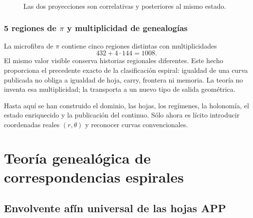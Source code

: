 \begin{figure}[htbp]
\centering
{}
\caption{Las dos proyecciones son correlativas y posteriores al mismo estado.}
\label{espiral:fig:doble-proyeccion-espiral}
\end{figure}

\section{5 regiones de \texorpdfstring{\(\pi\)}{pi} y multiplicidad de genealogías}

La microfibra de \(\pi\) contiene cinco regiones distintas con
multiplicidades
\[
 432+4\cdot144=1008.
\]
El mismo valor visible conserva historias regionales diferentes. Este hecho
proporciona el precedente exacto de la clasificación espiral: igualdad de
una curva publicada no obliga a igualdad de hoja, carry, frontera ni
memoria. La teoría no inventa esa multiplicidad; la transporta a un nuevo
tipo de salida geométrica.

\begin{resultbox}[title={Antecedencia causal del continuo discreto respecto del lector radial}]
Hasta aquí se han construido el dominio, las hojas, los regímenes, la
holonomía, el estado enriquecido y la publicación del continuo. Sólo ahora
es lícito introducir coordenadas reales \((r,\theta)\) y reconocer curvas
convencionales.
\end{resultbox}
\part{Teoría genealógica de correspondencias espirales}

\chapter{Envolvente afín universal de las hojas APP}

